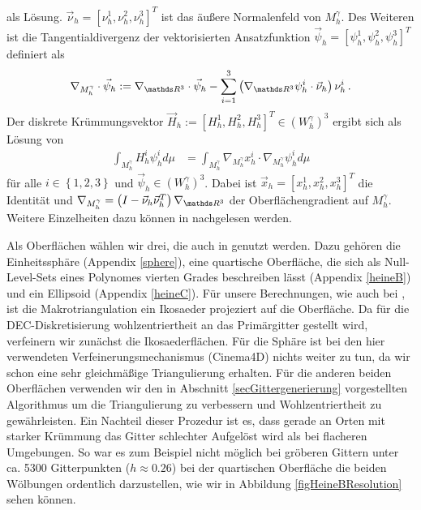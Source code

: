   als Lösung.
  \( \vec{\nu}_{h}=\left[ \nu_{h}^{1}, \nu_{h}^{2}, \nu_{h}^{3} \right]^{T} \) ist das äußere Normalenfeld von \( M_{h}^{\gamma} \).
  Des Weiteren ist die Tangentialdivergenz der vektorisierten Ansatzfunktion \( \vec{\psi}_{h} = \left[ \psi_{h}^{1}, \psi_{h}^{2}, \psi_{h}^{3} \right]^{T} \) definiert als
  \begin{align}
    \nabla_{M_{h}^{\gamma}} \cdot \vec{\psi}_{h} := \nabla_{\R^{3}} \cdot \vec{\psi}_{h} 
                          - \sum_{i=1}^{3 }\left( \nabla_{\R^{3}}\psi_{h}^{i} \cdot \vec{\nu}_{h} \right) \nu_{h}^{i} \formpunkt
  \end{align}
  Der diskrete Krümmungsvektor \( \vec{H}_{h} := \left[ H_{h}^{1}, H_{h}^{2}, H_{h}^{3} \right]^{T} \in\left( W_{h}^{\gamma} \right)^{3} \) ergibt sich als Lösung von
  \begin{align}
    \int_{M_{h}^{\gamma}} H_{h}^{i} \psi_{h}^{i} d\mu
      &=  \int_{M_{h}^{\gamma}} \nabla_{M_{h}^{\gamma}} x_{h}^{i} \cdot \nabla_{M_{h}^{\gamma}}\psi_{h}^{i} d\mu
  \end{align}
  für alle \( i\in\left\{ 1,2,3 \right\} \) und \( \vec{\psi}_{h}\in \left( W_{h}^{\gamma} \right)^{3} \).
  Dabei ist \( \vec{x}_{h} = \left[ x_{h}^{1}, x_{h}^{2}, x_{h}^{3}\right]^{T} \) die Identität 
  und \(\nabla_{M_{h}^{\gamma}} = \left( I - \vec{\nu}_{h} \vec{\nu}^{T}_{h} \right)\nabla_{\R^{3}} \) der Oberflächengradient auf \( M_{h}^{\gamma} \). 
  Weitere Einzelheiten dazu können in \cite{heine} nachgelesen werden.
  
  Als Oberflächen wählen wir drei, die auch in \cite{heine} genutzt werden. 
  Dazu gehören die Einheitssphäre (Appendix \ref{sphere}), eine quartische Oberfläche, die sich als Null-Level-Sets eines Polynomes vierten
  Grades beschreiben lässt (Appendix \ref{heineB}) und ein Ellipsoid (Appendix \ref{heineC}).
  Für unsere Berechnungen, wie auch bei \cite{heine}, ist die Makrotriangulation ein Ikosaeder projeziert auf die Oberfläche.
  Da für die DEC-Diskretisierung wohlzentriertheit an das Primärgitter gestellt wird, verfeinern wir zunächst die Ikosaederflächen.
  Für die Sphäre ist bei den hier verwendeten Verfeinerungsmechanismus (Cinema4D) nichts weiter zu tun, da wir schon eine sehr gleichmäßige
  Triangulierung erhalten.
  Für die anderen beiden Oberflächen verwenden wir den in Abschnitt \ref{secGittergenerierung} vorgestellten Algorithmus um die
  Triangulierung zu verbessern und Wohlzentriertheit zu gewährleisten.
  Ein Nachteil dieser Prozedur ist es, dass gerade an Orten mit starker Krümmung das Gitter schlechter Aufgelöst wird als bei flacheren
  Umgebungen. 
  So war es zum Beispiel nicht möglich bei gröberen Gittern unter ca. 5300 Gitterpunkten (\( h\approx 0.26 \)) bei der quartischen
  Oberfläche die beiden Wölbungen ordentlich darzustellen, wie wir in Abbildung \ref{figHeineBResolution} sehen können.
  
